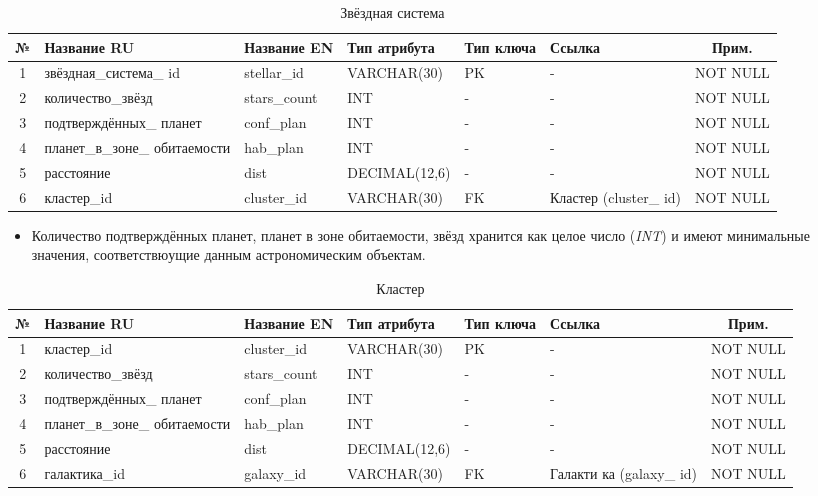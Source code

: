 \documentclass[14pt,a4paper]{extarticle}
\begin{document}
	\begin{table}[H]
    \centering
    \caption{Звёздная система}
    \small
\begin{tabular}{|c|p{3.2cm}|p{2.6cm}|p{2.8cm}|p{1.5cm}|p{1.5cm}|c|}
\hline
№ & Название RU & Название EN & Тип атрибута & Тип ключа & Ссылка & Прим. \\
\hline
1 & звёздная\_система\_ id & stellar\_id & VARCHAR(30) & PK & - & NOT NULL \\
2 & количество\_звёзд & stars\_count & INT & - & - & NOT NULL \\
3 & подтверждённых\_ планет & conf\_plan & INT & - & - & NOT NULL \\
4 & планет\_в\_зоне\_ обитаемости & hab\_plan & INT & - & - & NOT NULL \\
5 & расстояние & dist & DECIMAL(12,6) & - & - & NOT NULL \\
6 & кластер\_id & cluster\_id & VARCHAR(30) & FK & Кластер (cluster\_ id) & NOT NULL \\
\hline
\end{tabular}
\end{table}

	\begin{itemize}
		\item Количество подтверждённых планет, планет в зоне обитаемости, звёзд хранится как целое число (\textit{INT}) и имеют минимальные значения, соответствюущие данным астрономическим объектам.
	\end{itemize}

	\begin{table}[H]
    \centering
    \caption{Кластер}
    \small
\begin{tabular}{|c|p{3.2cm}|p{2.6cm}|p{2.8cm}|p{1.5cm}|p{1.5cm}|c|}
\hline
№ & Название RU & Название EN & Тип атрибута & Тип ключа & Ссылка & Прим. \\
\hline
1 & кластер\_id & cluster\_id & VARCHAR(30) & PK & - & NOT NULL \\
2 & количество\_звёзд & stars\_count & INT & - & - & NOT NULL \\
3 & подтверждённых\_ планет & conf\_plan & INT & - & - & NOT NULL \\
4 & планет\_в\_зоне\_ обитаемости & hab\_plan & INT & - & - & NOT NULL \\
5 & расстояние & dist & DECIMAL(12,6) & - & - & NOT NULL \\
6 & галактика\_id & galaxy\_id & VARCHAR(30) & FK & Галакти ка (galaxy\_ id) & NOT NULL \\
\hline
\end{tabular}
\end{table}
\end{document}
